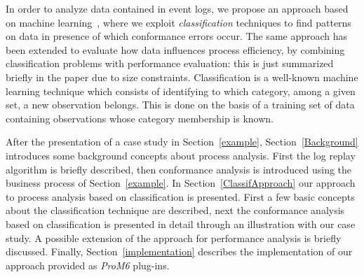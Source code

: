 \documentclass{llncs}
\begin{document}
In order to analyze data contained in event logs, we propose an approach based on {machine learning}~\cite{tan2005introduction}, where we exploit \emph{classification} techniques to find patterns on data in presence of which conformance errors occur. The same approach has been extended to evaluate how data influences  process efficiency, by combining classification problems with performance evaluation: this is just summarized briefly in the paper due to size constraints.  Classification is a well-known {machine learning} technique which consists of identifying to which category, among a given set, a new observation belongs. This is done on the basis of a training set of data containing observations whose category membership is known.

After the presentation of a case study in Section~\ref{example}, Section~\ref{Background} introduces some background concepts about process analysis. First the log replay algorithm is briefly described, then conformance  analysis is introduced using the business process of Section~\ref{example}. In Section~\ref{ClassifApproach} our approach to process analysis based on classification is presented. First a few basic concepts about the classification technique are described, next the conformance analysis based on classification is presented in detail through an illustration with our case study.  A possible extension of the approach for performance analysis is briefly discussed. Finally, Section~\ref{implementation} describes the implementation of our approach provided as \emph{ProM6}\cite{DBLP:conf/bpm/AalstDGRVW09} plug-ins.
\end{document}
